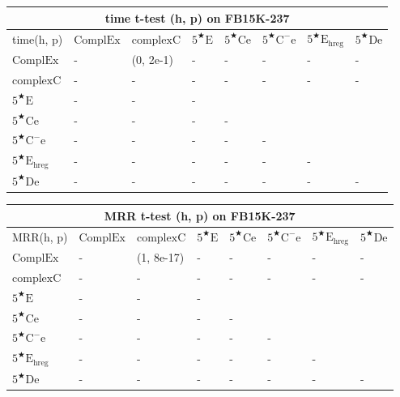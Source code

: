 \documentclass[11pt]{article}
\begin{document}
\begin{table}
\centering
\begin{tabular}{llllllll}
    \hline
    \multicolumn{8}{c}{time t-test (h, p) on FB15K-237}\\
    \hline
    time(h, p) & $\mathrm{ComplEx}$ & $\mathrm{complexC}$ & $5^{\bigstar}\mathrm{E}$ & $5^{\bigstar}\mathrm{Ce}$ & $5^{\bigstar}\mathrm{C^{-}e}$ & $5^{\bigstar}\mathrm{E_{hreg}}$ & $5^{\bigstar}\mathrm{De}$\\
    $\mathrm{ComplEx}$ & - & (0, 2e-1) & - & - & - & - & - \\
    $\mathrm{complexC}$ & - & - & - & - & - & - & - \\
    $5^{\bigstar}\mathrm{E}$ & - & - & -\\
    $5^{\bigstar}\mathrm{Ce}$ & - & - & - & -\\
    $5^{\bigstar}\mathrm{C^{-}e}$ & - & - & - & - & -\\
    $5^{\bigstar}\mathrm{E_{hreg}}$ & - & - & - & - & - & -\\
    $5^{\bigstar}\mathrm{De}$ & - & - & - & - & - & - & -\\
    \hline
\end{tabular}
\begin{tabular}{llllllll}
    \hline
    \multicolumn{8}{c}{MRR t-test (h, p) on FB15K-237}\\
    \hline
    MRR(h, p) & $\mathrm{ComplEx}$ & $\mathrm{complexC}$ & $5^{\bigstar}\mathrm{E}$ & $5^{\bigstar}\mathrm{Ce}$ & $5^{\bigstar}\mathrm{C^{-}e}$ & $5^{\bigstar}\mathrm{E_{hreg}}$ & $5^{\bigstar}\mathrm{De}$\\
    $\mathrm{ComplEx}$ & - & (1, 8e-17) & - & - & - & - & - \\
    $\mathrm{complexC}$ & - & - & - & - & - & - & - \\
    $5^{\bigstar}\mathrm{E}$ & - & - & -\\
    $5^{\bigstar}\mathrm{Ce}$ & - & - & - & -\\
    $5^{\bigstar}\mathrm{C^{-}e}$ & - & - & - & - & -\\
    $5^{\bigstar}\mathrm{E_{hreg}}$ & - & - & - & - & - & -\\
    $5^{\bigstar}\mathrm{De}$ & - & - & - & - & - & - & -\\
    \hline
\end{tabular}


\end{table}
\end{document}
